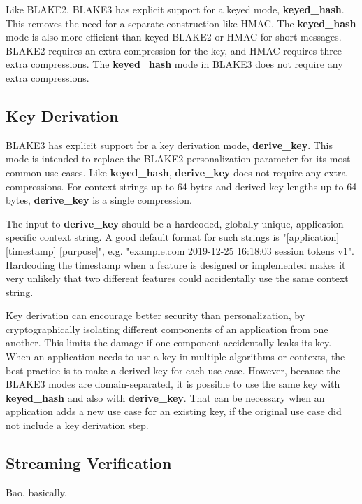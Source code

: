 \documentclass[11pt,notitlepage,a4paper]{article}
\begin{document}
Like BLAKE2, BLAKE3 has explicit support for a keyed mode,
\textbf{keyed\_hash}. This removes the need for a separate construction like
HMAC. The \textbf{keyed\_hash} mode is also more efficient than keyed BLAKE2 or
HMAC for short messages. BLAKE2 requires an extra compression for the key, and
HMAC requires three extra compressions. The \textbf{keyed\_hash} mode in BLAKE3
does not require any extra compressions.

\subsection{Key Derivation}\label{sec:mac}

BLAKE3 has explicit support for a key derivation mode, \textbf{derive\_key}.
This mode is intended to replace the BLAKE2 personalization parameter for its
most common use cases. Like \textbf{keyed\_hash}, \textbf{derive\_key} does not
require any extra compressions. For context strings up to 64 bytes and derived
key lengths up to 64 bytes, \textbf{derive\_key} is a single compression.

The input to \textbf{derive\_key} should be a hardcoded, globally unique,
application-specific context string. A good default format for such strings is
"[application] [timestamp] [purpose]", e.g. "example.com 2019-12-25 16:18:03
session tokens v1". Hardcoding the timestamp when a feature is designed or
implemented makes it very unlikely that two different features could
accidentally use the same context string.

Key derivation can encourage better security than personalization, by
cryptographically isolating different components of an application from one
another. This limits the damage if one component accidentally leaks its key.
When an application needs to use a key in multiple algorithms or contexts, the
best practice is to make a derived key for each use case. However, because the
BLAKE3 modes are domain-separated, it is possible to use the same key with
\textbf{keyed\_hash} and also with \textbf{derive\_key}. That can be necessary
when an application adds a new use case for an existing key, if the original
use case did not include a key derivation step.

\subsection{Streaming Verification}\label{sec:streamingverification}

Bao, basically.
\end{document}
